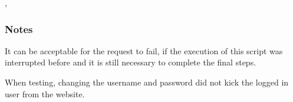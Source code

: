 \documentclass[letterpaper,10pt,english]{sphinxmanual}
\begin{document}
\begin{fulllineitems}


{\hyperref[\detokenize{grafanaAPI:module-grafanaAPI}]{}}, {\hyperref[\detokenize{setup:gpSetup.changeAdminPassword}]{}}


\subsubsection*{Notes}

It can be acceptable for the request to fail, if the execution of this script
was interrupted before and it is still necessary to complete the final steps.

When testing, changing the username and password did not kick the logged in 
user from the website.

\end{fulllineitems}

\end{document}
